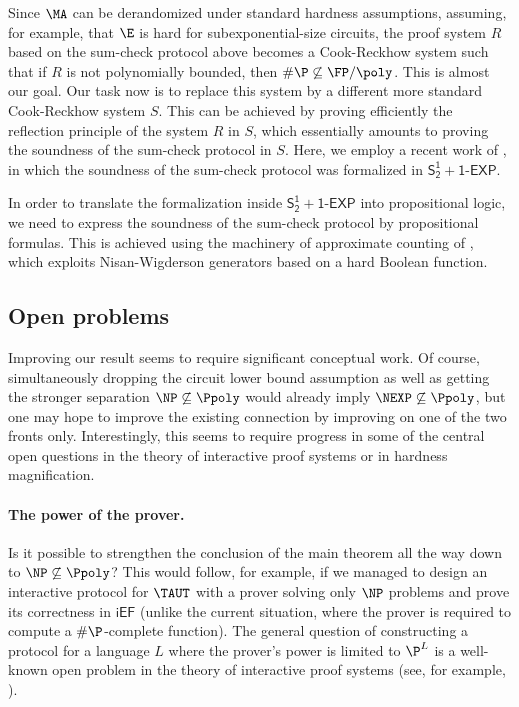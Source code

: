 \documentclass[11pt]{article}
\newcommand{\SOTEXP}{\mathsf{S^1_2} + \mathsf{1\textsf{-}EXP}}
\newcommand{\iEF}{\mathsf{iEF}}
\theoremstyle{definition}
\theoremstyle{plain}
\theoremstyle{remark}
\begin{document}
Since $\MA$ can be derandomized under standard hardness assumptions, assuming, for example, that $\E$ is hard for subexponential-size circuits, the proof system $R$ based on the sum-check protocol above becomes a Cook-Reckhow system such that if $R$ is not polynomially bounded, then $\#\P\not\subseteq\FP/\poly$. This is almost our goal. Our task now is to replace this system by a different more standard Cook-Reckhow system $S$. This can be achieved by proving efficiently the reflection principle of the system $R$ in $S$, which essentially amounts to proving the soundness of the sum-check protocol in $S$. Here, we employ a recent work of \citeauthor{Kha23} \cite{Kha23}, in which the soundness of the sum-check protocol was formalized in $\SOTEXP$. 

In order to translate the formalization inside $\SOTEXP$ into propositional logic, we need to express the soundness of the sum-check protocol by propositional formulas. This is achieved using the machinery of approximate counting of \citeauthor{Jer07} \cite{Jer07}, which exploits Nisan-Wigderson generators based on a hard Boolean function.

\subsection*{Open problems}
Improving our result seems to require significant conceptual work. Of course, simultaneously dropping the circuit lower bound assumption as well as getting the stronger separation $\NP \not\subseteq \Ppoly$ would already imply $\NEXP \not\subseteq \Ppoly$, but one may hope to improve the existing connection by improving on one of the two fronts only. Interestingly, this seems to require progress in some of the central open questions in the theory of interactive proof systems or in hardness magnification.

\paragraph{The power of the prover.} Is it possible to strengthen the conclusion of the main theorem all the way down to $\NP\not\subseteq\Ppoly$? This would follow, for example, if we managed to design an interactive protocol for $\TAUT$ with a prover solving only $\NP$ problems and prove its correctness in $\iEF$ (unlike the current situation, where the prover is required to compute a $\#\P$-complete function). The general question of constructing a protocol for a language $L$ where the prover's power is limited to $\P^L$ is a well-known open problem in the theory of interactive proof systems (see, for example, \cite[§8.4]{AB09}).
\end{document}
